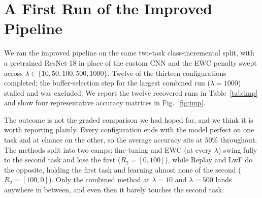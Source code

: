 \documentclass[11pt]{article}
\begin{document}
\section{A First Run of the Improved Pipeline}\label{sec:improved}
We ran the improved pipeline on the same two-task class-incremental split, with a
pretrained ResNet-18 in place of the custom CNN and the EWC penalty swept across
$\lambda\in\{10,50,100,500,1000\}$. Twelve of the thirteen configurations
completed; the buffer-selection step for the largest combined run
($\lambda{=}1000$) stalled and was excluded. We report the twelve recovered runs
in Table~\ref{tab:imp} and show four representative accuracy matrices in
Fig.~\ref{fig:imp}.

The outcome is not the graded comparison we had hoped for, and we think it is
worth reporting plainly. Every configuration ends with the model perfect on one
task and at chance on the other, so the average accuracy sits at $50\%$
throughout. The methods split into two camps: fine-tuning and EWC (at every
$\lambda$) swing fully to the second task and lose the first ($R_{2}=[0,100]$),
while Replay and LwF do the opposite, holding the first task and learning almost
none of the second ($R_{2}=[100,0]$). Only the combined method at $\lambda{=}10$
and $\lambda{=}500$ lands anywhere in between, and even then it barely touches the
second task.
\end{document}
